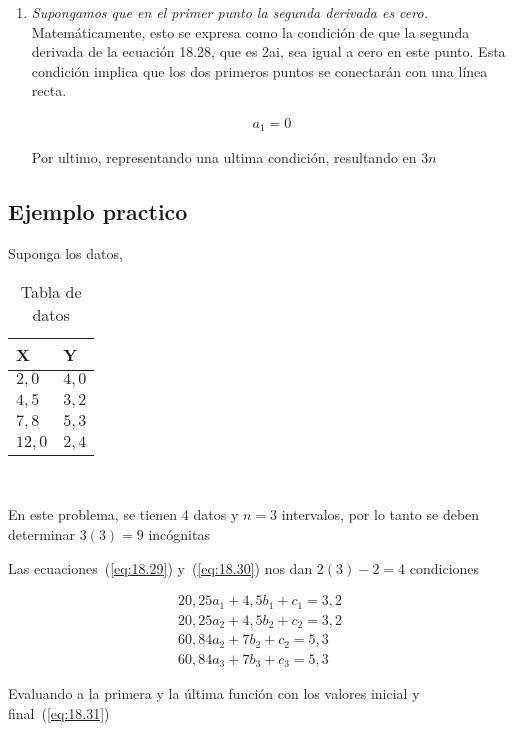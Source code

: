 \documentclass[conference]{IEEEtran}
\begin{document}
\begin{enumerate}
	\item \textit{Supongamos que en el primer punto la segunda derivada es cero.}
	      Matemáticamente, esto se expresa como la condición de que la segunda
	      derivada de la ecuación 18.28, que es 2ai, sea igual a cero en este punto.
	      Esta condición implica que los dos primeros puntos se conectarán
	      con una línea recta.

	      \begin{align}
		      a_{1} = 0
		      \label{eq:18.34}
	      \end{align}

	      Por ultimo, representando una ultima condición, resultando
	      en $3n$
\end{enumerate}

\subsection*{Ejemplo practico}

Suponga los datos,

\begin{table}[H]
	\begin{tabularx}{\linewidth}{|>{\centering\arraybackslash}X|>{\centering\arraybackslash}X|}
		\hline
		\textbf{X} & \textbf{Y} \\ \hline
		$2,0$      & $4,0$      \\ \hline
		$4,5$      & $3,2$      \\ \hline
		$7,8$      & $5,3$      \\ \hline
		$12,0$     & $2,4$      \\ \hline
	\end{tabularx}
	\label{tab:ejemplo_tabularx}~\caption{Tabla de datos}
\end{table}

En este problema, se tienen 4 datos y $n = 3$ intervalos, por lo tanto
se deben determinar $3(3) = 9$ incógnitas

Las ecuaciones~(\ref{eq:18.29}) y~(\ref{eq:18.30}) nos dan $2(3) - 2 = 4$
condiciones

\begin{align*}
	20,25a_{1} + 4,5b_{1} + c_{1} = 3,2 \\
	20,25a_{2} + 4,5b_{2} + c_{2} = 3,2 \\
	60,84a_{2} + 7b_{2} + c_{2} = 5,3   \\
	60,84a_{3} + 7b_{3} + c_{3} = 5,3
\end{align*}

Evaluando a la primera y la última función con los valores inicial y
final~(\ref{eq:18.31})
\end{document}
